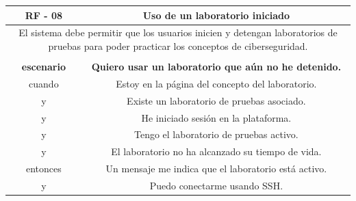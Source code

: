         \begin{table}[!htbp]
            \centering
            \begin{tabular}{|c|c|}
                \hline
                \textbf{RF - 08} & \textbf{Uso de un laboratorio iniciado} \\
                \hline
                \multicolumn{2}{|p{15cm}|}{
                    El sistema debe permitir que los usuarios inicien y detengan laboratorios de pruebas para poder practicar los conceptos de ciberseguridad.
                } \\
                \hline
                \multicolumn{2}{|p{15cm}|}{
                } \\
                \hline
                \textbf{escenario} & \textbf{Quiero usar un laboratorio que aún no he detenido.} \\
                cuando & Estoy en la página del concepto del laboratorio. \\
                y & Existe un laboratorio de pruebas asociado. \\
                y & He iniciado sesión en la plataforma. \\
                y & Tengo el laboratorio de pruebas activo. \\
                y & El laboratorio no ha alcanzado su tiempo de vida. \\
                entonces & Un mensaje me indica que el laboratorio está activo. \\
                y & Puedo conectarme usando SSH. \\
                \hline
            \end{tabular}
        \end{table}

